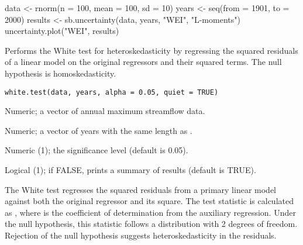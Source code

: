 \documentclass[a4paper]{book}
\begin{document}
%
\begin{Examples}
\begin{ExampleCode}
data <- rnorm(n = 100, mean = 100, sd = 10)
years <- seq(from = 1901, to = 2000)
results <- sb.uncertainty(data, years, "WEI", "L-moments")
uncertainty.plot("WEI", results)

\end{ExampleCode}
\end{Examples}
%
\begin{Description}
Performs the White test for heteroskedasticity by regressing the squared residuals of a
linear model on the original regressors and their squared terms. The null hypothesis
is homoskedasticity.
\end{Description}
%
\begin{Usage}
\begin{verbatim}
white.test(data, years, alpha = 0.05, quiet = TRUE)
\end{verbatim}
\end{Usage}
%
\begin{Arguments}
\begin{ldescription}
\item[\code{data}] Numeric; a vector of annual maximum streamflow data.

\item[\code{years}] Numeric; a vector of years with the same length as .

\item[\code{alpha}] Numeric (1); the significance level (default is 0.05).

\item[\code{quiet}] Logical (1); if FALSE, prints a summary of results (default is TRUE).
\end{ldescription}
\end{Arguments}
%
\begin{Details}
The White test regresses the squared residuals from a primary linear model
 against both the original regressor and its square.
The test statistic is calculated as , where  is the
coefficient of determination from the auxiliary regression. Under the null hypothesis,
this statistic follows a  distribution with 2 degrees of freedom.
Rejection of the null hypothesis suggests heteroskedasticity in the residuals.
\end{Details}
%
\end{document}
